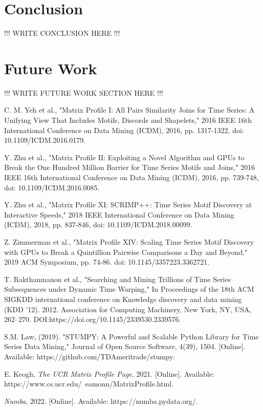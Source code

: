 \documentclass[conference]{IEEEtran}
\begin{document}
\section{Conclusion}
!!! WRITE CONCLUSION HERE !!!

\section{Future Work}
!!! WRITE FUTURE WORK SECTION HERE !!!




\begin{thebibliography}{8}  

 C. M. Yeh et al., "Matrix Profile I: All Pairs Similarity Joins for Time Series: A Unifying View That Includes Motifs, Discords and Shapelets," 2016 IEEE 16th International Conference on Data Mining (ICDM), 2016, pp. 1317-1322, doi: 10.1109/ICDM.2016.0179.

 Y. Zhu et al., "Matrix Profile II: Exploiting a Novel Algorithm and GPUs to Break the One Hundred Million Barrier for Time Series Motifs and Joins," 2016 IEEE 16th International Conference on Data Mining (ICDM), 2016, pp. 739-748, doi: 10.1109/ICDM.2016.0085.

 Y. Zhu et al., "Matrix Profile XI: SCRIMP++: Time Series Motif Discovery at Interactive Speeds," 2018 IEEE International Conference on Data Mining (ICDM), 2018, pp. 837-846, doi: 10.1109/ICDM.2018.00099.

 Z. Zimmerman et al., "Matrix Profile XIV: Scaling Time Series Motif Discovery with GPUs to Break a Quintillion Pairwise Comparisons a Day and Beyond," 2019 ACM Symposium, pp. 74-86. doi: 10.1145/3357223.3362721. 

 T. Rakthanmanon et al., "Searching and Mining Trillions of Time Series Subsequences under Dynamic Time Warping," In Proceedings of the 18th ACM SIGKDD international conference on Knowledge discovery and data mining (KDD '12). 2012. Association for Computing Machinery, New York, NY, USA, 262–270. DOI:https://doi.org/10.1145/2339530.2339576.

 S.M. Law, (2019). "STUMPY: A Powerful and Scalable Python Library for Time Series Data Mining," Journal of Open Source Software, 4(39), 1504. [Online]. Available: https://github.com/TDAmeritrade/stumpy.

 E. Keogh, \emph{The UCR Matrix Profile Page}, 2021. [Online]. Available: https://www.cs.ucr.edu/~eamonn/MatrixProfile.html.

 \emph{Numba}, 2022. [Online]. Available: https://numba.pydata.org/.

\end{thebibliography}
\end{document}
